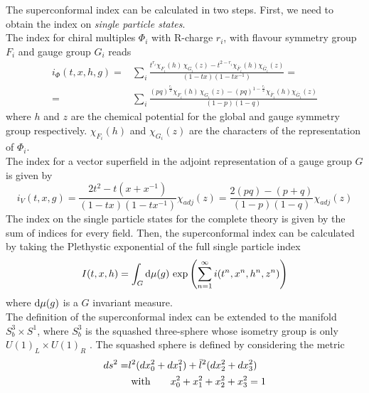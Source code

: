 The superconformal index can be calculated in two steps.
First, we need to obtain the index on \emph{single particle states}.\\
The index for chiral multiples $\Phi_i$ with R-charge $r_i$, with flavour symmetry group $F_i$ and gauge group $G_i$ reads \cite{Dolan:2008qi}
\begin{align}
i_{\Phi}(t,x,h,g) =&  \sum_{i} \frac{ t^{r_i} \chi_{F_i}(h) \, \chi_{G_i}(z) - t^{2-r_i} \chi_{\bar{F}_i}(h) \chi_{\bar{G}_i}(z)}{ (1-tx) (1- t x^{-1})} = \\
=& \sum_{i} \frac{ (pq)^{\frac{r_i}{2}} \chi_{F_i}(h) \, \chi_{G_i}(z) - (pq)^{1-\frac{r_i}{2}} \chi_{\bar{F}_i}(h) \chi_{\bar{G}_i}(z)}{ (1-p) (1- q)} 
\end{align}
where $h$ and $z$ are the chemical potential for the global and gauge symmetry group respectively. $\chi_{F_i}(h)$ and $\chi_{G_i}(z)$ are the characters of the representation of $\Phi_i$.\\
The index for a vector superfield in the adjoint representation of a gauge group $G$ is given by \cite{Dolan:2008qi}
\begin{equation}
i_{V} (t,x,g) = \frac{2 t^2 - t(x + x^{-1})}{(1-tx) (1 - tx^{-1})} \chi_{adj}(z) =  \frac{2 (pq) - (p+q )}{(1-p) (1 - q)} \chi_{adj}(z)
\end{equation}
The index on the single particle states for the complete theory is given by the sum of indices for every field. 
Then, the superconformal index can be calculated by taking the Plethystic exponential \cite{Feng:2007ur} of the full single particle index
\begin{equation}
  I(t,x,h) = \int_{G} \hbox{d} \mu(g)\,  \exp{ \left(  \sum_{n=1}^{\infty}i(t^n,x^n,h^n,z^n) \right)}
  \end{equation}  
where $\hbox{d} \mu(g)$ is a $G$ invariant measure.\\
The definition of the superconformal index can be extended to the manifold $S_b^3 \times S^1$, where $S_b^3$ is the squashed three-sphere whose isometry group is only $U(1)_L \times U(1)_R$ \cite{Hama:2011ea}.
The squashed sphere is defined by considering the metric 
\begin{align}
 d s^2 =& l^2 ( d x_0^2 + d x_1^2 ) + \bar{l}^2 ( d x_2^2 + d x_3^2) \\
 & \; \hbox{with} \qquad  x_0^2 + x_1^2 + x_2^2 + x_3^2 = 1
\end{align}

